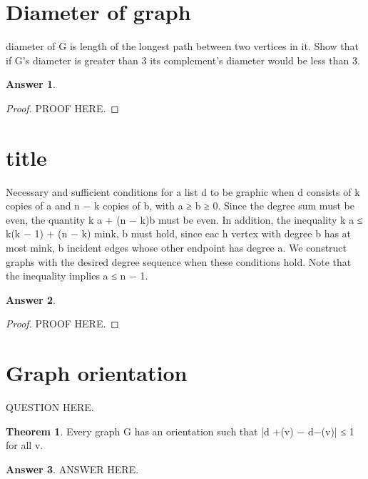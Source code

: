 \documentclass[a4paper]{article}
\renewcommand{\(}{\left(}
\renewcommand{\)}{\right)}
\theoremstyle{plain}
\theoremstyle{plain}
\theoremstyle{definition}
\newtheorem*{answer}{Answer}
\newtheorem{theorem}{Theorem}[section]
\begin{document}
\section{Diameter of graph}
diameter of G is length of the longest path between two vertices in it.
Show that if G’s diameter is greater than 3 its complement’s diameter would be less than 3.
\begin{shaded}
\begin{answer}
\begin{proof}
PROOF HERE.
\end{proof}
\end{answer}
\end{shaded}

\section{title}
Necessary and sufficient conditions for a list d to be graphic when d consists of k copies of a and
n − k copies of b, with a ≥ b ≥ 0. Since the degree sum must be even, the quantity k a + (n − k)b
must be even. In addition, the inequality k a ≤ k(k − 1) + (n − k) min{k, b} must hold, since eac h
vertex with degree b has at most min{k, b} incident edges whose other endpoint has degree a. We
construct graphs with the desired degree sequence when these conditions hold. Note that the
inequality implies a ≤ n − 1.
\begin{shaded}
\begin{answer}
\begin{proof}
PROOF HERE.
\end{proof}
\end{answer}
\end{shaded}

\section{Graph orientation}
QUESTION HERE.
\begin{theorem}
Every graph G has an orientation such that |d +(v) − d−(v)| ≤ 1 for all v.
\end{theorem}
\begin{shaded}
\begin{answer}
ANSWER HERE.
\end{answer}
\end{shaded}
\end{document}

